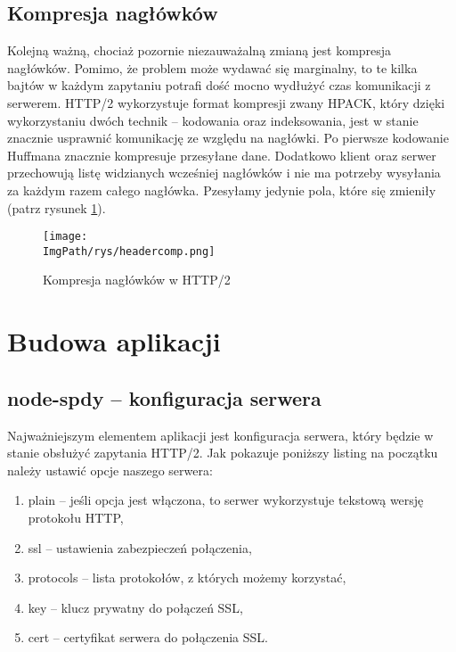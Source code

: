 \documentclass[a4paper,12pt,twoside,openany]{report}
\newcommand{\ImgPath}{.}
\begin{document}
\section{Kompresja nagłówków}

Kolejną ważną, chociaż pozornie niezauważalną zmianą jest kompresja nagłówków.
Pomimo, że problem może wydawać się marginalny, to te kilka bajtów w każdym zapytaniu potrafi dość mocno wydłużyć czas komunikacji z serwerem.
HTTP/2 wykorzystuje format kompresji zwany HPACK, który dzięki wykorzystaniu dwóch technik -- kodowania oraz indeksowania, jest w stanie znacznie usprawnić komunikację ze względu na nagłówki.
Po pierwsze kodowanie Huffmana znacznie kompresuje przesyłane dane.
Dodatkowo klient oraz serwer przechowują listę widzianych wcześniej nagłówków i nie ma potrzeby wysyłania za każdym razem całego nagłówka.
Pzesyłamy jedynie pola, które się zmieniły (patrz rysunek \ref{schematHeaderComp}).

\begin{figure}[!htbp]
	\begin{center}
\centering
\texttt{[image: \\ImgPath/rys/headercomp.png]}
\end{center}
	\caption{Kompresja nagłówków w HTTP/2}
	\label{schematHeaderComp}
\end{figure}

\chapter{Budowa aplikacji}

\section{node-spdy -- konfiguracja serwera}

Najważniejszym elementem aplikacji jest konfiguracja serwera, który będzie w stanie obsłużyć zapytania HTTP/2.
Jak pokazuje poniższy listing na początku należy ustawić opcje naszego serwera:

\begin{enumerate}
	\item plain -- jeśli opcja jest włączona, to serwer wykorzystuje tekstową wersję protokołu HTTP, 
	\item ssl -- ustawienia zabezpieczeń połączenia,
	\item protocols -- lista protokołów, z których możemy korzystać,
	\item key -- klucz prywatny do połączeń SSL,
	\item cert -- certyfikat serwera do połączenia SSL.
\end{enumerate}
\end{document}
